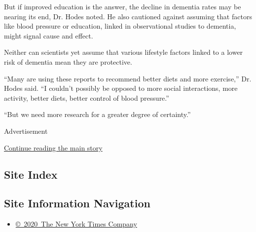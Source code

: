 But if improved education is the answer, the decline in dementia rates
may be nearing its end, Dr. Hodes noted. He also cautioned against
assuming that factors like blood pressure or education, linked in
observational studies to dementia, might signal cause and effect.

Neither can scientists yet assume that various lifestyle factors linked
to a lower risk of dementia mean they are protective.

``Many are using these reports to recommend better diets and more
exercise,'' Dr. Hodes said. ``I couldn't possibly be opposed to more
social interactions, more activity, better diets, better control of
blood pressure.''

``But we need more research for a greater degree of certainty.''

Advertisement

\protect\hyperlink{after-bottom}{Continue reading the main story}

\hypertarget{site-index}{%
\subsection{Site Index}\label{site-index}}

\hypertarget{site-information-navigation}{%
\subsection{Site Information
Navigation}\label{site-information-navigation}}

\begin{itemize}
\tightlist
\item
  \href{https://help.nytimes3xbfgragh.onion/hc/en-us/articles/115014792127-Copyright-notice}{©~2020~The
  New York Times Company}
\end{itemize}

